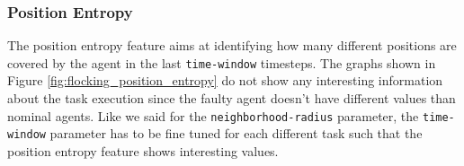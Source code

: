 \documentclass[../../Thesis.tex]{subfiles}
\begin{document}
			\subsubsection{Position Entropy}
				The position entropy feature aims at identifying how many different positions are covered by the agent in the last \verb|time-window| timesteps. The graphs shown in Figure \ref{fig:flocking_position_entropy} do not show any interesting information about the task execution since the faulty agent doesn't have different values than nominal agents. Like we said for the \verb|neighborhood-radius| parameter, the \verb|time-window| parameter has to be fine tuned for each different task such that the position entropy feature shows interesting values.
				\begin{figure}
					\centering
					\quad
\end{figure}
\end{document}
